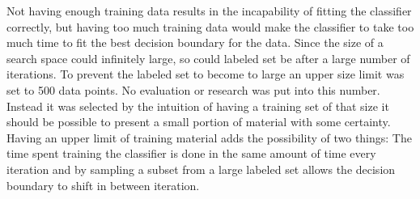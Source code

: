 Not having enough training data results in the incapability of fitting the classifier correctly, but having too much training data would make the classifier to take too much time to fit the best decision boundary for the data. Since the size of a search space could infinitely large, so could labeled set be after a large number of iterations. To prevent the labeled set to become to large an upper size limit was set to 500 data points. No evaluation or research was put into this number. Instead it was selected by the intuition of having a training set of that size it should be possible to present a small portion of material with some certainty. Having an upper limit of training material adds the possibility of two things: The time spent training the classifier is done in the same amount of time every iteration and by sampling a subset from a large labeled set allows the decision boundary to shift in between iteration.   

